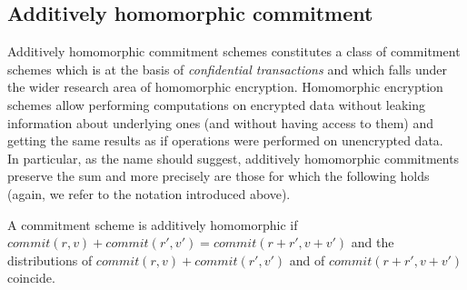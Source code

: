\subsection{Additively homomorphic commitment}
\label{add_homomorphic_commit}
Additively homomorphic commitment schemes constitutes a class of commitment schemes which is at the basis of \textit{confidential transactions} and which falls under the wider research area of homomorphic encryption. Homomorphic encryption schemes allow performing computations on encrypted data without leaking information about underlying ones (and without having access to them) and getting the same results as if operations were performed on unencrypted data.\\
In particular, as the name should suggest, additively homomorphic commitments preserve the sum and more precisely are those for which the following holds (again, we refer to the notation introduced above).
\begin{mydef}
    A commitment scheme is additively homomorphic if\\ $commit(r,v) + commit(r',v') = commit(r+r',v+v')$ and the distributions of $commit(r,v) + commit(r',v')$ and of $commit(r+r',v+v')$ coincide.
\end{mydef}


